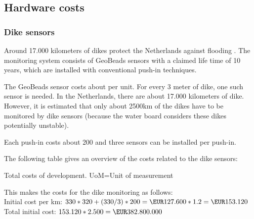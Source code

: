 \subsection{Hardware costs}
\subsubsection{Dike sensors}
Around 17.000 kilometers of dikes protect the Netherlands against flooding \cite{DMC}. 
The monitoring system consists of GeoBeads sensors with a claimed life time of 10 years, which are installed with conventional push-in techniques. 

The GeoBeads sensor costs about  per unit. For every 3 meter of dike, one such sensor is needed. In the Netherlands, there are about 17.000 kilometers of dike. However, it is estimated that only about 2500km of the dikes have to be monitored by dike sensors (because the water board considers these dikes potentially unstable).

Each push-in costs about \EUR{}200 and three sensors can be installed per push-in\cite{TUDelftPHD}. %

The following table gives an overview of the costs related to the dike sensors:

\begin{table}[H]
	\label{table:total-dev-costs2} 
	\caption{Total costs of development. UoM=Unit of measurement}
\end{table}

This makes the costs for the dike monitoring as follows: \\
Initial cost per km: $ 330 * 320  +  (330 / 3) * 200 = \EUR127.600 * 1.2 = \EUR153.120$\\
Total initial cost: $ 153.120 * 2.500 = \EUR 382.800.000$

